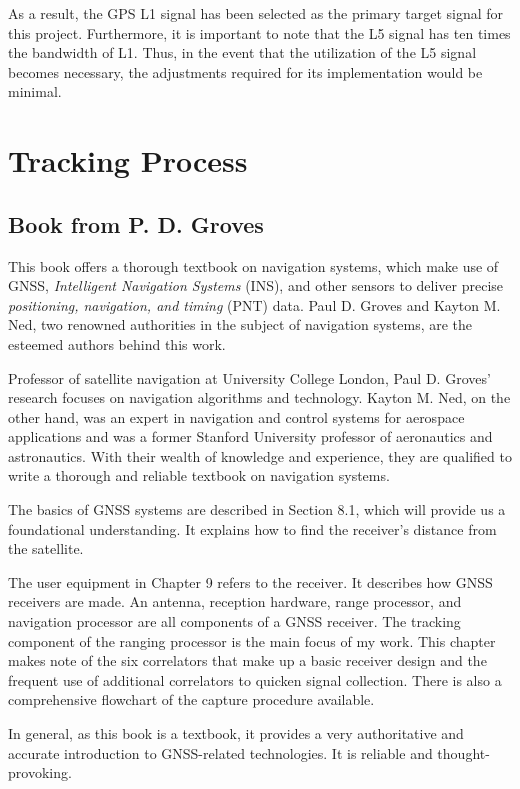As a result, the GPS L1 signal has been selected as the primary target signal for this project. Furthermore, it is important to note that the L5 signal has ten times the bandwidth of L1. Thus, in the event that the utilization of the L5 signal becomes necessary, the adjustments required for its implementation would be minimal.

\section{Tracking Process}
\subsection{Book from P. D. Groves\texorpdfstring{\cite{RN178}}{}}
This book offers a thorough textbook on navigation systems, which make use of GNSS, \textit{Intelligent Navigation Systems} (INS), and other sensors to deliver precise \textit{positioning, navigation, and timing} (PNT) data. Paul D. Groves and Kayton M. Ned, two renowned authorities in the subject of navigation systems, are the esteemed authors behind this work.

Professor of satellite navigation at University College London, Paul D. Groves' research focuses on navigation algorithms and technology. Kayton M. Ned, on the other hand, was an expert in navigation and control systems for aerospace applications and was a former Stanford University professor of aeronautics and astronautics. With their wealth of knowledge and experience, they are qualified to write a thorough and reliable textbook on navigation systems.

The basics of GNSS systems are described in Section 8.1, which will provide us a foundational understanding. It explains how to find the receiver's distance from the satellite.

The user equipment in Chapter 9 refers to the receiver. It describes how GNSS receivers are made. An antenna, reception hardware, range processor, and navigation processor are all components of a GNSS receiver. The tracking component of the ranging processor is the main focus of my work. This chapter makes note of the six correlators that make up a basic receiver design and the frequent use of additional correlators to quicken signal collection. There is also a comprehensive flowchart of the capture procedure available.

In general, as this book is a textbook, it provides a very authoritative and accurate introduction to GNSS-related technologies. It is reliable and thought-provoking.

